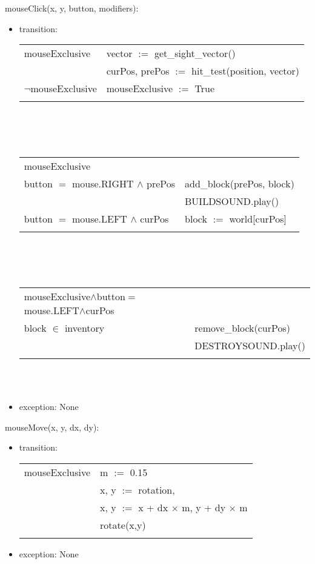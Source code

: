 \documentclass{article}
\begin{document}
\noindent mouseClick(x, y, button, modifiers):
\begin{itemize}
\item transition: 

\begin{tabular}{|l|l|}
\hhline{|-|-|}
mouseExclusive & vector $:=$ get\_sight\_vector()\\
\hhline{|~|-|}
 & curPos, prePos $:=$ hit\_test(position, vector)\\
\hhline{|-|-|}
$\neg$mouseExclusive & mouseExclusive $:=$ True\\
\hhline{|-|-|}
\end{tabular}
\\\\\\
\begin{tabular}{|l|l|}
\hhline{|-|}
 mouseExclusive\\
\hhline{|-|-|}
 button $=$ mouse.RIGHT $\land$ prePos & add\_block(prePos, block)\\
 & BUILDSOUND.play()\\
\hhline{|-|-|}
 button $=$ mouse.LEFT $\land$ curPos & block $:=$ world[curPos]\\
\hhline{|-|-|}
\end{tabular}
\\\\\\
\begin{tabular}{|l|l|}
\hhline{|-|}
mouseExclusive$\land$button$=$mouse.LEFT$\land$curPos \\
\hhline{|-|-|}
 block $\in$ inventory & remove\_block(curPos)\\
 &DESTROYSOUND.play()\\
\hhline{|-|-|}
\end{tabular}
\\\\
\item exception: None
\end{itemize}\vspace{6mm}

\noindent mouseMove(x, y, dx, dy):
\begin{itemize}
\item transition: 

\begin{tabular}{|l|l|}
\hhline{|-|-|}
mouseExclusive & m $:=$ 0.15 \\
& x, y $:=$ rotation, \\
& x, y $:=$ x + dx $\times$ m, y + dy $\times$ m\\
&rotate(x,y)\\
\hhline{|-|-|}
\end{tabular}

\item exception: None
\end{itemize}\vspace{6mm}
\end{document}

